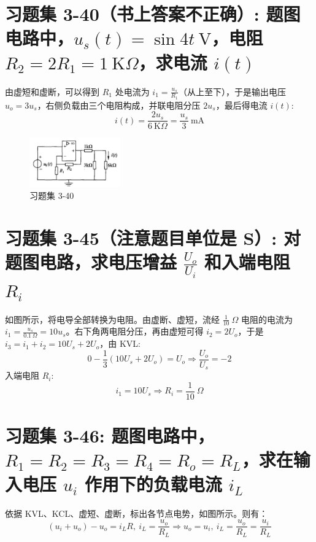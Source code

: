 \documentclass[UTF8]{report}
\def\mA{\ \mathrm{mA}}
\def\kO{\ \mathrm{K}\Omega}
\def\KO{\ \mathrm{K}\Omega}
\theoremstyle{MyLineTheoremStyle} %
\theoremstyle{MyBlockTheoremStyle} %
\theoremstyle{MySubsubsectionStyle} %
\begin{document}
\section{习题集 3-40（书上答案不正确）: 题图电路中，$u_s(t) = \sin 4t\ \mathrm{V} $，电阻 $R_2 = 2R_1 = 1 \kO$，求电流 $i(t)$}

由虚短和虚断，可以得到 $R_1$ 处电流为 $i_1 = \frac{u_s}{R_1}$（从上至下），于是输出电压 $u_o = 3u_s$，右侧负载由三个电阻构成，并联电阻分压 $2u_s$，最后得电流 $i(t)$:
\begin{equation}
i(t) = \frac{2u_s}{6 \KO} = \frac{u_s}{3} \mA
\end{equation}

\begin{figure}[H]\centering
\includegraphics[width=0.35\textwidth]{assets/3/3-40.jpg}
\caption{ 习题集 3-40}
\end{figure}

\section{习题集 3-45（注意题目单位是 S）: 对题图电路，求电压增益 $\frac{U_o}{U_i}$ 和入端电阻 $R_i$}

如图所示，将电导全部转换为电阻。由虚断、虚短，流经 $\frac{1}{10}\ \Omega$ 电阻的电流为 $i_1 = \frac{u_s}{0.1\ \Omega} = 10u_s$。右下角两电阻分压，再由虚短可得 $i_2 = 2U_o$，于是 $i_3 = i_1 + i_2 = 10 U_s + 2U_o$，由 KVL:
\begin{equation}
0 - \frac{1}{3}(10 U_s + 2U_o) = U_o \Longrightarrow  \frac{U_o}{U_s} = -2
\end{equation}
入端电阻 $R_i$: 
\begin{equation}
    i_1 = 10U_s \Longrightarrow  R_i = \frac{1}{10}\ \Omega
\end{equation}

\section{习题集 3-46: 题图电路中，$R_1 = R_2 = R_3 = R_4 = R_o = R_L$，求在输入电压 $u_i$ 作用下的负载电流 $i_L$}

依据 KVL、KCL、虚短、虚断，标出各节点电势，如图所示。则有：
\begin{equation}
(u_i+u_o)-u_o = i_LR,\ i_L = \frac{u_o}{R_L} \Longrightarrow u_o = u_i,\ i_L = \frac{u_o}{R_L} = \frac{u_i}{R_L}
\end{equation}
\end{document}
